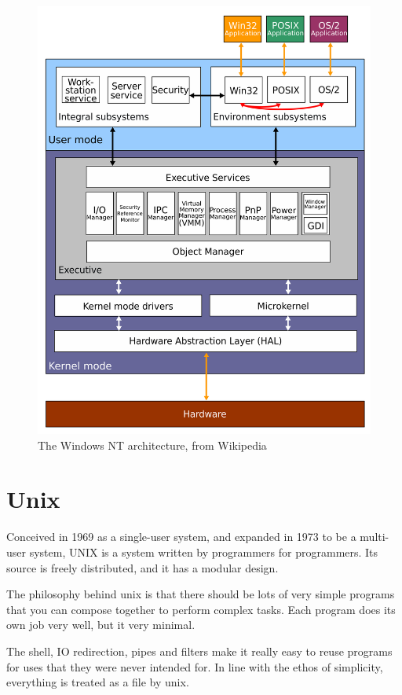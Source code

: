 \begin{figure}[ht!]
  \includegraphics[width=\textwidth]{images/windows-arch}
  \caption{The Windows NT architecture, from Wikipedia}
  \label{win-arch}
\end{figure}

\section{Unix}

Conceived in 1969 as a single-user system, and expanded in 1973 to be a multi-
user system, UNIX is a system written by programmers for programmers. Its
source is freely distributed, and it has a modular design.

The philosophy behind unix is that there should be lots of very simple programs
that you can compose together to perform complex tasks. Each program does its
own job very well, but it very minimal.

The shell, IO redirection, pipes and filters make it really easy to reuse
programs for uses that they were never intended for. In line with the ethos of
simplicity, everything is treated as a file by unix.

